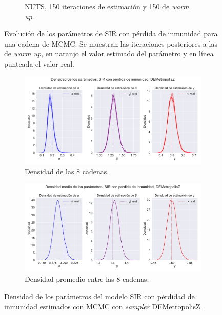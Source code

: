\begin{figure}[h]
\begin{subfigure}[b]{0.49\linewidth}
        \caption{NUTS, 150 iteraciones de estimación y 150 de \textit{warm up}.}
        \label{fig:NUTS_sir_rec_params_trace}
    \end{subfigure}
    \caption{Evolución de los parámetros de SIR con pérdida de inmunidad para una cadena de MCMC. Se muestran las iteraciones posteriores a las de \textit{warm up}, en naranjo el valor estimado del parámetro y en línea punteada el valor real.}
    \label{fig:MCMC_sir_params_trace}
\end{figure}

\begin{figure}[h]
    \centering
    \begin{subfigure}[b]{\linewidth}
        \centering
        \includegraphics[width=0.55\linewidth]{img/content/chapter4/DEMetropolis_sir_rec_params_density.pdf}
        \caption{Densidad de las 8 cadenas.}
    \end{subfigure}
     \begin{subfigure}[b]{\linewidth}
        \centering
        \includegraphics[width=0.55\linewidth]{img/content/chapter4/DEMetropolis_sir_rec_params_density_mean.pdf}
        \caption{Densidad promedio entre las 8 cadenas.}
    \end{subfigure}
    \caption{Densidad de los parámetros del modelo SIR con pérdidad de inmunidad estimados con MCMC con \textit{sampler} DEMetropolisZ.}
\end{figure}

